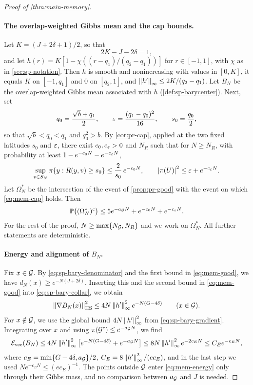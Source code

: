 \begin{proof}[Proof of \cref{thm:main-memory}]
\paragraph{The overlap-weighted Gibbs mean and the cap bounds.} Let $K=(J+2\delta+1)/2$, so that
\begin{equation}\label{eq:mem-K}
2K-J-2\delta=1,
\end{equation}
and let $h(r)=K[1-\chi((r-q_1)/(q_2-q_1))]$ for $r\in[-1,1]$, with $\chi$ as in \cref{sec:sp-notation}. Then $h$ is smooth and nonincreasing with values in $[0,K]$, it equals $K$ on $[-1,q_1]$ and $0$ on $[q_2,1]$, and $\left\lVert h'\right\rVert_\infty\le2K/(q_2-q_1)$. Let $B_N$ be the overlap-weighted Gibbs mean associated with $h$ (\cref{def:sp-barycenter}). Next, set
\[
q_0=\frac{\sqrt b+q_1}2,\qquad \varepsilon=\frac{(q_1-q_0)^2}{16},\qquad s_0=\frac{q_0}2,
\]
so that $\sqrt b<q_0<q_1$ and $q_0^2>b$. By \cref{cor:pr-cap}, applied at the two fixed latitudes $s_0$ and $\varepsilon$, there exist $c_0,c_\varepsilon>0$ and $N_R$ such that for $N\ge N_R$, with probability at least $1-e^{-c_0N}-e^{-c_\varepsilon N}$,
\begin{equation}\label{eq:mem-cap}
\sup_{v\in S_N}\pi\{y:R(y,v)\ge s_0\}\le\frac2{s_0}\,e^{-c_0N},
\qquad
\left|\pi(U)\right|^2\le\varepsilon+e^{-c_\varepsilon N}.
\end{equation}
Let $\Omega^*_N$ be the intersection of the event of \cref{prop:pr-good} with the event on which \eqref{eq:mem-cap} holds. Then
\begin{equation}\label{eq:mem-event}
\mathbb P\big((\Omega^*_N)^c\big)\le5e^{-a_\mathcal G N}+e^{-c_0N}+e^{-c_\varepsilon N}.
\end{equation}
For the rest of the proof, $N\ge\max\{N_\mathcal G,N_R\}$ and we work on $\Omega^*_N$. All further statements are deterministic.

\paragraph{Energy and alignment of $B_N$.} Fix $x\in\mathcal G$. By \eqref{eq:sp-bary-denominator} and the first bound in \eqref{eq:mem-good}, we have $d_N(x)\ge e^{-N(J+2\delta)}$. Inserting this and the second bound in \eqref{eq:mem-good} into \eqref{eq:sp-bary-collar}, we obtain
\[
\left\lVert\nabla B_N(x)\right\rVert_{\rm HS}^2\le4N\left\lVert h'\right\rVert_\infty^2e^{-N(G-4\delta)}\qquad(x\in\mathcal G).
\]
For $x\notin\mathcal G$, we use the global bound $4N\left\lVert h'\right\rVert_\infty^2$ from \eqref{eq:sp-bary-gradient}. Integrating over $x$ and using $\pi(\mathcal G^c)\le e^{-a_\mathcal G N}$, we find
\begin{equation}\label{eq:mem-energy}
\mathcal E_{\rm vec}(B_N)\le4N\left\lVert h'\right\rVert_\infty^2\big[e^{-N(G-4\delta)}+e^{-a_\mathcal G N}\big]\le8N\left\lVert h'\right\rVert_\infty^2e^{-2c_EN}\le C_Ee^{-c_EN},
\end{equation}
where $c_E=\min\{G-4\delta,a_\mathcal G\}/2$, $C_E=8\left\lVert h'\right\rVert_\infty^2/(ec_E)$, and in the last step we used $Ne^{-c_EN}\le(ec_E)^{-1}$. The points outside $\mathcal G$ enter \eqref{eq:mem-energy} only through their Gibbs mass, and no comparison between $a_\mathcal G$ and $J$ is needed.


\end{proof}
